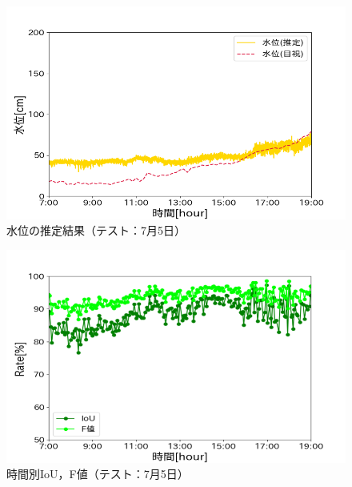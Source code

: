 \begin{figure}[t] 
  \begin{center}
    \includegraphics[width=\linewidth]{image/0705_kousa.png}
  \end{center}
  \caption{水位の推定結果（テスト：7月5日）}
  \label{kousa_0705}
\end{figure}

\begin{figure}[b] 
  \begin{center}
    \includegraphics[width=\linewidth]{image/0705_f_IoU.png}
  \end{center}
  \caption{時間別IoU，F値（テスト：7月5日）}
  \label{kousa_IoU_0705}
\end{figure}


